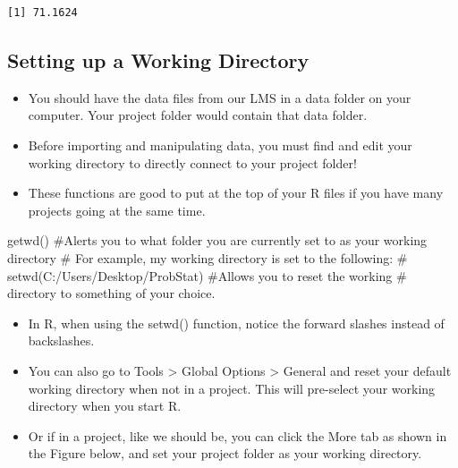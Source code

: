 \documentclass[
  letterpaper,
  DIV=11,
  numbers=noendperiod]{scrreprt}
\newenvironment{Shaded}{\begin{snugshade}}{\end{snugshade}}
\newcommand{\CommentTok}[1]{\textcolor[rgb]{0.37,0.37,0.37}{#1}}
\newcommand{\FunctionTok}[1]{\textcolor[rgb]{0.28,0.35,0.67}{#1}}
\newcommand{\NormalTok}[1]{\textcolor[rgb]{0.00,0.23,0.31}{#1}}
\providecommand{\tightlist}{%
  \setlength{\itemsep}{0pt}\setlength{\parskip}{0pt}}\usepackage{longtable,booktabs,array}
\begin{document}
\begin{verbatim}
[1] 71.1624
\end{verbatim}

\subsection{Setting up a Working
Directory}\label{setting-up-a-working-directory}

\begin{itemize}
\item
  You should have the data files from our LMS in a data folder on your
  computer. Your project folder would contain that data folder.
\item
  Before importing and manipulating data, you must find and edit your
  working directory to directly connect to your project folder!
\item
  These functions are good to put at the top of your R files if you have
  many projects going at the same time.
\end{itemize}

\begin{Shaded}
\begin{Highlighting}[]
\FunctionTok{getwd}\NormalTok{()  }\CommentTok{\#Alerts you to what folder you are currently set to as your working directory}
\CommentTok{\# For example, my working directory is set to the following:}
\CommentTok{\# setwd(\textquotesingle{}C:/Users/Desktop/ProbStat\textquotesingle{}) \#Allows you to reset the working}
\CommentTok{\# directory to something of your choice.}
\end{Highlighting}
\end{Shaded}

\begin{itemize}
\tightlist
\item
  In R, when using the setwd() function, notice the forward slashes
  instead of backslashes.
\item
  You can also go to Tools \textgreater{} Global Options \textgreater{}
  General and reset your default working directory when not in a
  project. This will pre-select your working directory when you start R.
\item
  Or if in a project, like we should be, you can click the More tab as
  shown in the Figure below, and set your project folder as your working
  directory.
\end{itemize}
\end{document}
